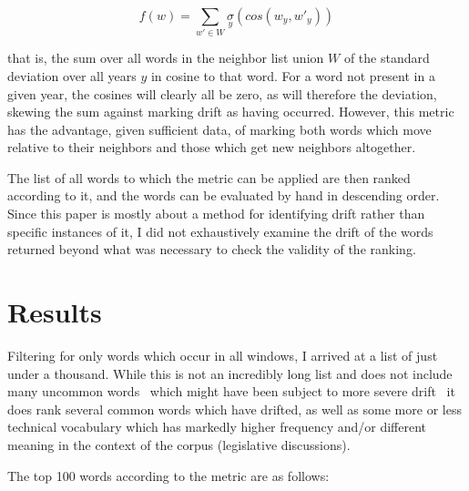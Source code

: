 \documentclass{article}
\begin{document}
$$ f(w) = \sum_{w' \in W} \underset{y}\sigma(cos(w_y, w'_y)) $$

that is, the sum over all words in the neighbor list union $W$ of the standard deviation over all years $y$ in cosine to that word. For a word not present in a given year, the cosines will clearly all be zero, as will therefore the deviation, skewing the sum against marking drift as having occurred. However, this metric has the advantage, given sufficient data, of marking both words which move relative to their neighbors and those which get new neighbors altogether.

The list of all words to which the metric can be applied are then ranked according to it, and the words can be evaluated by hand in descending order. Since this paper is mostly about a method for identifying drift rather than specific instances of it, I did not exhaustively examine the drift of the words returned beyond what was necessary to check the validity of the ranking.

\section{Results}

Filtering for only words which occur in all windows, I arrived at a list of just under a thousand. While this is not an incredibly long list and does not include many uncommon words \textemdash\ which might have been subject to more severe drift \textemdash\ it does rank several common words which have drifted, as well as some more or less technical vocabulary which has markedly higher frequency and/or different meaning in the context of the corpus (legislative discussions).

The top 100 words according to the metric are as follows:
\end{document}
